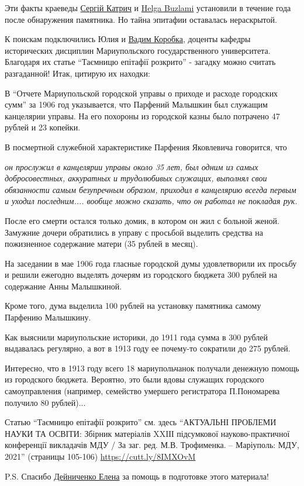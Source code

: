 Эти факты краеведы
\href{https://www.facebook.com/profile.php?id=100014684651188}{Сергій Катрич} и
\href{https://www.facebook.com/helga.buzlami}{Helga Buzlami} установили в
течение года после обнаружения памятника. Но тайна эпитафии оставалась
нераскрытой.

К поискам подключились Юлия и \href{https://www.facebook.com/vadikor}{Вадим
Коробка}, доценты кафедры исторических дисциплин Мариупольского
государственного университета. Благодаря их статье \enquote{Таємницю епітафії
розкрито} - загадку можно считать разгаданной! Итак, цитирую их находки:

В \enquote{Отчете Мариупольской городской управы о приходе и расходе городских сумм} за
1906 год указывается, что Парфений Малышкин был служащим канцелярии управы. На
его похороны из городской казны было потрачено 47 рублей и 23 копейки.

В посмертной служебной характеристике Парфения Яковлевича говорится, что 

\begin{leftbar}
\noindent\em он прослужил в канцелярии управы около 35 лет, был одним из самых
добросовестных, аккуратных и трудолюбивых служащих, выполнял свои обязанности
самым безупречным образом, приходил в канцелярию всегда первым и уходил
последним.... вообще можно сказать, что он работал не покладая рук.	
\end{leftbar}

После его смерти остался только домик, в котором он жил с больной женой.
Замужние дочери обратились в управу с просьбой выделить средства на пожизненное
содержание матери (35 рублей в месяц).

На заседании в мае 1906 года гласные городской думы удовлетворили их просьбу и
решили ежегодно выделять дочерям из городского бюджета 300 рублей на содержание
Анны Малышкиной.

Кроме того, дума выделила 100 рублей на установку памятника самому Парфению Малышкину.

Как выяснили мариупольские историки, до 1911 года сумма в 300 рублей выдавалась
регулярно, а вот в 1913 году ее почему-то сократили до 275 рублей.

Интересно, что в 1913 году всего 18 мариупольчанок получали денежную помощь из
городского бюджета. Вероятно, это были вдовы служащих городского самоуправления
(например, семейство умершего регистратора П.Пономарева получило 80 рублей)...

Статью \enquote{Таємницю епітафії розкрито} см. здесь \enquote{АКТУАЛЬНІ ПРОБЛЕМИ НАУКИ ТА
ОСВІТИ: Збірник матеріалів XXIІІ підсумкової науково-практичної конференції
викладачів МДУ / За заг. ред. М.В. Трофименка. – Маріуполь: МДУ, 2021}
(страницы 105-106) \url{https://cutt.ly/8IMXOvM}

P.S. Спасибо \href{https://www.facebook.com/profile.php?id=100013986611400}{Дейниченко Елена} за помощь в подготовке этого материала! 🙂 

